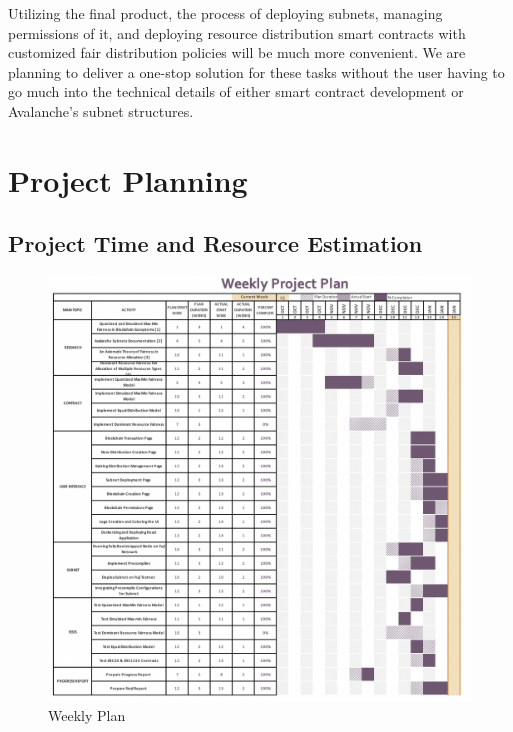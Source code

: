 \documentclass[a4paper,12pt]{report}
\begin{document}
Utilizing the final product, the process of deploying subnets, managing permissions of it, and deploying resource distribution smart contracts with customized fair distribution policies will be much more convenient. We are planning to deliver a one-stop solution for these tasks without the user having to go much into the technical details of either smart contract development or Avalanche’s subnet structures.

\section{Project Planning}

\subsection{Project Time and Resource Estimation}
\begin{figure}[H]
	\centering
	\includegraphics[width=1\textwidth]{weeklyplan.png}
	\caption{Weekly Plan}
\end{figure}
\end{document}
